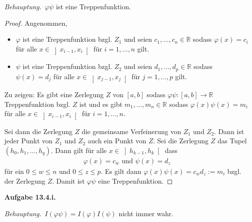 \documentclass[draft,a5paper]{article}
\newcommand{\beh}{\textit{Behauptung.}\ }
\newcommand{\aufgn}[1]{\textbf{Aufgabe #1.}}
\newcommand{\mg}[1]{\mathbb{#1}}
\begin{document}
\beh \(\varphi \psi\) ist eine Treppenfunktion.

\begin{proof}
Angenommen,
\begin{itemize}
\item  \(\varphi\) ist eine Treppenfunktion
bzgl. \(Z_1\) und seien \(c_1, \ldots, c_n \in \mg{R}\)
sodass \(\varphi(x) = c_i\) für alle $x \in
\left]x_{i-1}, x_i \right[$ für \(i = 1, \ldots, n\) gilt.
\item  \(\psi\) ist eine Treppenfunktion
bzgl. \(Z_2\) und seien \(d_1, \ldots, d_p \in \mg{R}\)
sodass \(\psi(x) = d_j\) für alle $x \in
\left]x_{j-1}, x_j \right[$ für \(j = 1, \ldots, p\) gilt.
\end{itemize}

Zu zeigen: Es gibt eine Zerlegung \(Z\) von
\(\left[a, b\right]\) sodass
\(\varphi \psi \colon \left[a, b\right] \to \mg{R}\)
Treppenfunktion bzgl. \(Z\) ist und es gibt
\(m_1, \ldots, m_n \in \mg{R}\) sodass
\(\varphi(x) \psi(x) = m_i\) für alle
\(x \in \left]x_{i-1}, x_i \right[\) für
\(i = 1, \ldots, n\).

Sei dann die Zerlegung \(Z\) die gemeinsame Verfeinerung
von \(Z_1\) und \(Z_2\).  Dann ist jeder Punkt von \(Z_1\) und
\(Z_2\) auch ein Punkt von \(Z\).  Sei die Zerlegung \(Z\) das
Tupel \((h_0, h_1, \ldots, h_q)\).  Dann gilt für alle $x
\in \left]h_{k - 1}, h_k\right[$ dass
\begin{align*}
\varphi(x) = c_w \text{ und } \psi(x) = d_z
\end{align*}
für ein \(0 \le w \le n\) und \(0 \le z \le p\).  Es gilt
dann \(\varphi(x) \psi(x) = c_w d_z := m_i\) bzgl. der
Zerlegung \(Z\).  Damit ist \(\varphi \psi\) eine Treppenfunktion.
\end{proof}
\aufgn{13.4.i}

\beh \(I(\varphi \psi) = I(\varphi) I(\psi)\) nicht immer wahr.
\end{document}
